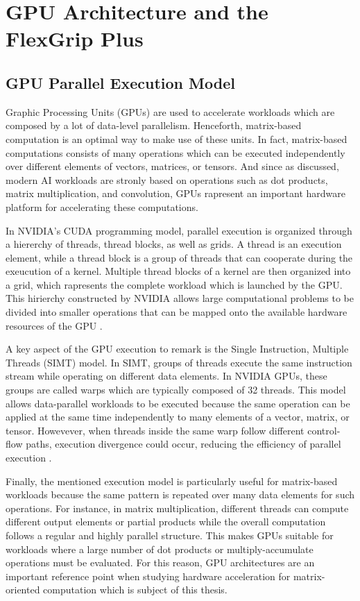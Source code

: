 \section{GPU Architecture and the FlexGrip Plus}
\label{sec:gpu_flexgrip_background}
\subsection{GPU Parallel Execution Model}
Graphic Processing Units (GPUs) are used to accelerate workloads which are composed by a lot of data-level parallelism. Henceforth, matrix-based computation is an optimal way to make use of these units. In fact, matrix-based computations consists of many operations which can be executed independently over different elements of vectors, matrices, or tensors. And since as discussed, modern AI workloads are stronly based on operations such as dot products, matrix multiplication, and convolution, GPUs rapresent an important hardware platform for accelerating these computations.

In NVIDIA's CUDA programming model, parallel execution is organized through a hiererchy of threads, thread blocks, as well as grids. A thread is an execution element, while a thread block is a group of threads that can cooperate during the exeucution of a kernel. Multiple thread blocks of a kernel are then organized into a grid, which rapresents the complete workload which is launched by the GPU. This hirierchy constructed by NVIDIA allows large computational problems to be divided into smaller operations that can be mapped onto the available hardware resources of the GPU \cite{nvidiaCudaProgrammingGuide}.

A key aspect of the GPU execution to remark is the Single Instruction, Multiple Threads (SIMT) model. In SIMT, groups of threads execute the same instruction stream while operating on different data elements. In NVIDIA GPUs, these groups are called warps which are typically composed of 32 threads. This model allows data-parallel workloads to be executed because the same operation can be applied at the same time independently to many elements of a vector, matrix, or tensor. Howevever, when threads inside the same warp follow different control-flow paths, execution divergence could occur, reducing the efficiency of parallel execution \cite{nvidiaCudaProgrammingGuide}. 

Finally, the mentioned execution model is particularly useful for matrix-based workloads because the same pattern is repeated over many data elements for such operations. For instance, in matrix multiplication, different threads can compute different output elements or partial products while the overall computation follows a regular and highly parallel structure. This makes GPUs suitable for workloads where a large number of dot products or multiply-accumulate operations must be evaluated. For this reason, GPU architectures are an important reference point when studying hardware acceleration for matrix-oriented computation which is subject of this thesis.

